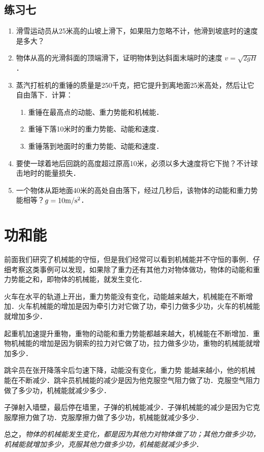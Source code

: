 \subsection*{练习七}
\begin{enumerate}
    \item 滑雪运动员从25米高的山坡上滑下，如果阻力忽略不计，他滑到坡底时的速度是多大？
    \item 物体从高的光滑斜面的顶端滑下，证明物体到达斜面末端时的速度 $v=\sqrt{2gH}$．
    \item 蒸汽打桩机的重锤的质量是250千克，把它提升到离地面25米高处，然后让它自由落下．计算：
    \begin{enumerate}
        \item 重锤在最高点的动能、重力势能和机械能．
        \item 重锤下落10米时的重力势能、动能和速度．
        \item 重锤落到地面时的重力势能、动能和速度．
    \end{enumerate}
\item 要使一球着地后回跳的高度超过原高10米，必须以多大速度将它下抛？不计球击地时的能量损失．
\item 一个物体从距地面40米的高处自由落下，经过几秒后，该物体的动能和重力势能相等？$g=10\text{m}/\text{s}^2$．
\end{enumerate}

\section{功和能}
前面我们研究了机械能的守恒，但是我们经常可以看到机械能并不守恒的事例．仔细考察这类事例可以发现，如果除了重力还有其他力对物体做功，物体的动能和重力势能之和，即物体的机械能，就发生变化．

火车在水平的轨道上开出，重力势能没有变化，动能越来越大，机械能在不断增加．火车机械能的增加是因为牵引力对它做了功，牵引力做多少功，火车的机械能就增加多少．

起重机加速提升重物，重物的动能和重力势能都越来越大，机械能在不断增加．重物机械能的增加是因为钢索的拉力对它做了功，拉力做多少功，重物的机械能就增加多少．

跳伞员在张开降落伞后匀速下降，动能没有变化，重力势
能越来越小，他的机械能在不断减少．跳伞员机械能的减少是因为他克服空气阻力做了功．克服空气阻力做了多少功，机械能就减少多少．

子弹射入墙壁，最后停在墙里，子弹的机械能减少．子弹机械能的减少是因为它克服摩擦力做了功．克服摩擦力做了多少功，机械能就减少多少．

总之，\textit{物体的机械能发生变化，都是因为其他力对物体做了功；其他力做多少功，机械能就增加多少，克服其他力做多少功，机械能就减少多少}．


